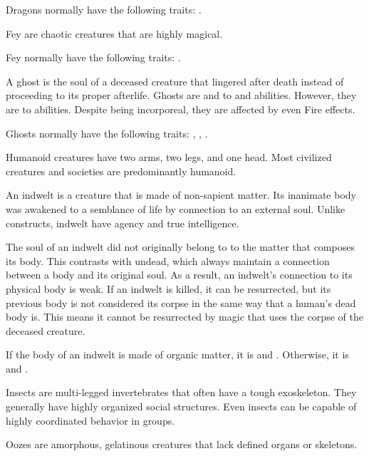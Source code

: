   Dragons normally have the following traits: .

   Fey are chaotic creatures that are highly magical.

  Fey normally have the following traits: .

  A ghost is the soul of a deceased creature that lingered after death instead of proceeding to its proper afterlife.
  Ghosts are  and \resistant to \atCold and \atEarth abilities.
  However, they are \vulnerable to \atFire abilities.
  Despite being incorporeal, they are affected by even  Fire effects.

  Ghosts normally have the following traits: , , .

  Humanoid creatures have two arms, two legs, and one head.
  Most civilized creatures and societies are predominantly humanoid.

  An indwelt is a creature that is made of non-sapient matter.
  Its inanimate body was awakened to a semblance of life by connection to an external soul.
  Unlike constructs, indwelt have agency and true intelligence.

  The soul of an indwelt did not originally belong to to the matter that composes its body.
  This contrasts with undead, which always maintain a connection between a body and its original soul.
  As a result, an indwelt's connection to its physical body is weak.
  If an indwelt is killed, it can be resurrected, but its previous body is not considered its corpse in the same way that a human's dead body is.
  This means it cannot be resurrected by magic that uses the corpse of the deceased creature.

  If the body of an indwelt is made of organic matter, it is  and .
  Otherwise, it is  and .

  Insects are multi-legged invertebrates that often have a tough exoskeleton.
  They generally have highly organized social structures.
  Even  insects can be capable of highly coordinated behavior in groups.

  Oozes are amorphous, gelatinous creatures that lack defined organs or skeletons.

